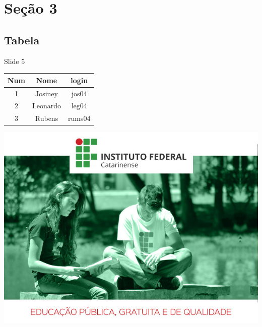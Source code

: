 \documentclass[xcolor=dvipsnames,table]{beamer}
\begin{document}
\section{Seção 3}
\subsection{Tabela}
\begin{frame}{Slide 5}
	\begin{tabular}{|c|c|c|}
		\hline
		Num & Nome & login \\
		\hline
		\hline
		1 & Josiney & jos04 \\
		\hline
		2 & Leonardo & leg04 \\
		\hline
		3 & Rubens & rums04 \\
		\hline
	\end{tabular}
\end{frame}

{
\usebackgroundtemplate%
{%
    \includegraphics[width=\paperwidth,height=\paperheight]{ultima-pag-menor.jpg}%
}
\begin{frame}[plain]{}
\end{frame}
}
	
\end{document}
